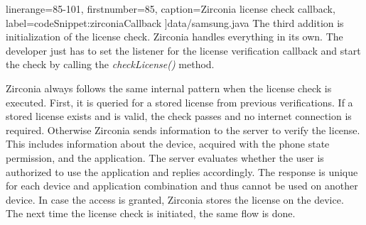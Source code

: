   linerange={85-101},
  firstnumber=85,
  caption={Zirconia license check callback},
  label={codeSnippet:zirconiaCallback}
]{data/samsung.java}
The third addition is initialization of the license check.
Zirconia handles everything in its own.
The developer just has to set the listener for the license verification callback and start the check by calling the \textit{checkLicense()} method.
\newline

Zirconia always follows the same internal pattern when the license check is executed.
First, it is queried for a stored license from previous verifications.
If a stored license exists and is valid, the check passes and no internet connection is required.
Otherwise Zirconia sends information to the server to verify the license.
This includes information about the device, acquired with the phone state permission, and the application.
The server evaluates whether the user is authorized to use the application and replies accordingly.
The response is unique for each device and application combination and thus cannot be used on another device.
In case the access is granted, Zirconia stores the license on the device.
The next time the license check is initiated, the same flow is done.
